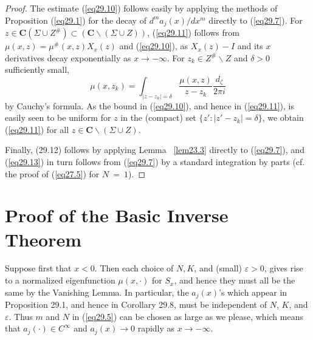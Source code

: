 \documentclass{surv-l}
\theoremstyle{plain}
\theoremstyle{definition}
\numberwithin{equation}{chapter}
\begin{document}
\begin{proof}
The estimate (\ref{eq29.10}) follows easily by applying the methods of Proposition (\ref{eq29.1}) for the decay of $d^{m}a_{j}(x)/dx^{m}$ directly to (\ref{eq29.7}). For $z \in \mathbf{C}(\Sigma\cup Z^{\#})\subset(\mathbf{C}\backslash (\Sigma\cup Z))$, (\ref{eq29.11}) follows from $\mu(x, z) =\mu^{\#}(x, z)X_{x}(z)$ and (\ref{eq29.10}), as $X_{x}(z)-I$ and its $x$ derivatives decay exponentially as $x\rightarrow-\infty$. For $z_{k}\in Z^{\#}\backslash Z$ and $\delta>0$ sufficiently small,
\begin{equation*}
\mu(x, z_{k})=\int_{|z-z_{k}|=\delta}\frac{\mu(x, z)}{z-z_{k}}\frac{d_{\zeta}}{2\pi i}
\end{equation*}
by Cauchy's formula. As the bound in (\ref{eq29.10}), and hence in (\ref{eq29.11}), is easily seen to be uniform for $z$ in the (compact) set $\{z':|z'-z_{k}|=\delta\}$, we obtain (\ref{eq29.11}) for all $z\in \mathbf{C}\backslash (\Sigma\cup Z)$.

Finally, (29.12) follows by applying Lemma ~\ref{lem23.3} directly to (\ref{eq29.7}), and (\ref{eq29.13}) in turn follows from (\ref{eq29.7}) by a standard integration by parts (cf. the proof of (\ref{eq27.5}) for $N\ =\ 1$).
\end{proof}

\section{Proof of the Basic Inverse Theorem}\label{sec30} Suppose first that $x<0$. Then each choice of $N, K$, and (small) $\varepsilon >0$, gives rise to a normalized eigenfunction $\mu(x, \cdot)$ for $S_{x}$, and hence they must all be the same by the Vanishing Lemma. In particular, the $a_{j}(x)$'s which appear in Proposition 29.1, and hence in Corollary 29.8, must be independent of $N$, $K$, and $\varepsilon$. Thus $m$ and $N$ in (\ref{eq29.5}) can be chosen as large as we please, which means that $a_{j}(\cdot)\in C^{\infty}$ and $a_{j}(x)\rightarrow 0$ rapidly as $ x\rightarrow-\infty$.
\end{document}
